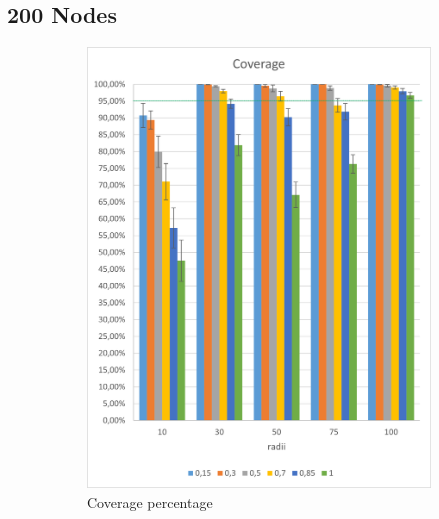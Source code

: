 \subsection{200 Nodes}
\begin{figure}[H]
\centering
\begin{subfigure}{.5\textwidth}
  \centering
  \includegraphics[width=1\linewidth]{./images/200CoverageCI.png}
  \caption{Coverage percentage}
  \label{fig:sub1}
\end{subfigure}%
\begin{subfigure}{.5\textwidth}
  \centering

\end{subfigure}
\end{figure}
